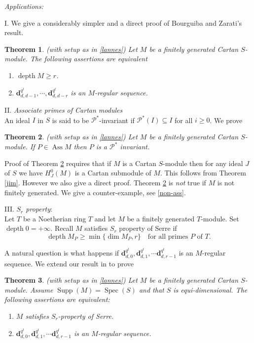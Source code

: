 \documentclass{amsart}
\newcommand{\Pc}{\mathcal{P} }
\newcommand{\db}{\mathbf{d} }
\newcommand{\Supp}{\operatorname{Supp}}
\newcommand{\depth}{\operatorname{depth}}
\newcommand{\Ass}{\operatorname{Ass}}
\newcommand{\Spec}{\operatorname{Spec}}
\theoremstyle{plain}
\newtheorem{theorem}{Theorem}[section]
\theoremstyle{definition}
\theoremstyle{remark}
\begin{document}
\emph{Applications:}

I. We give a considerably simpler and a direct proof of  Bourguiba and  Zarati's result.

\begin{theorem}
\label{bz-gen}(with setup as in \ref{lannes}) Let $M$ be a finitely generated Cartan $S$-module. The following assertions are equivalent
\begin{enumerate}[\rm (i)]
  \item $\depth M \geq r$.
  \item $\db_{d,d-1}^{q^t}, \cdots, \db_{d, d-r}^{q^t}$ is an $M$-regular sequence.
\end{enumerate}
\end{theorem}

 II.  \emph{Associate primes of Cartan modules}\\
An ideal $I$ in $S$ is said to   be $\Pc^*$-invariant if $\Pc^*(I) \subseteq I$ for all $i \geq 0$. We prove
\begin{theorem}
\label{ass}(with setup as in \ref{lannes}) Let $M$ be a finitely generated Cartan $S$-module. If $P \in \Ass M$ then $P$ is a $\Pc^*$ invariant.
\end{theorem}
Proof of Theorem \ref{ass} requires that if $M$ is a Cartan $S$-module then for any ideal $J$ of $S$ we have $H^0_J(M)$ is a Cartan submodule of $M$. This follows from Theorem \ref{jim}. However we also give a direct proof. Theorem \ref{ass} is \emph{not} true if $M$ is not finitely generated. We give a counter-example, see \ref{non-ass}.

 
 
III. \emph{$S_r$ property}: \\
Let $T$ be a Noetherian ring $T$ and let $M$ be a finitely generated $T$-module. Set $\depth 0 = + \infty$. Recall $M$ satisfies $S_r$ property of Serre if
$$ \depth M_P \geq \min\{\dim M_P, r \} \quad \text{for all primes $P$ of $T$}. $$


A natural question is what happens if $\db_{d,0}^{q^t}, \db_{d, 1}^{q^t},\cdots \db_{d,r-1}^{q^t}$ is an $M$-regular sequence. We extend our result in \cite[1.6]{P} to prove
\begin{theorem}
\label{s_r} (with setup as in \ref{lannes}) Let $M$ be a finitely generated Cartan $S$-module. Assume $\Supp(M) = \Spec(S)$  and that $S$ is equi-dimensional. The following assertions are equivalent:
\begin{enumerate}[\rm (i)]
  \item $M$ satisfies $S_r$-property of Serre.
  \item  $\db_{d,0}^{q^t}, \db_{d, 1}^{q^t},\cdots \db_{d,r-1}^{q^t}$ is an $M$-regular sequence.
\end{enumerate}
\end{theorem}
\end{document}
